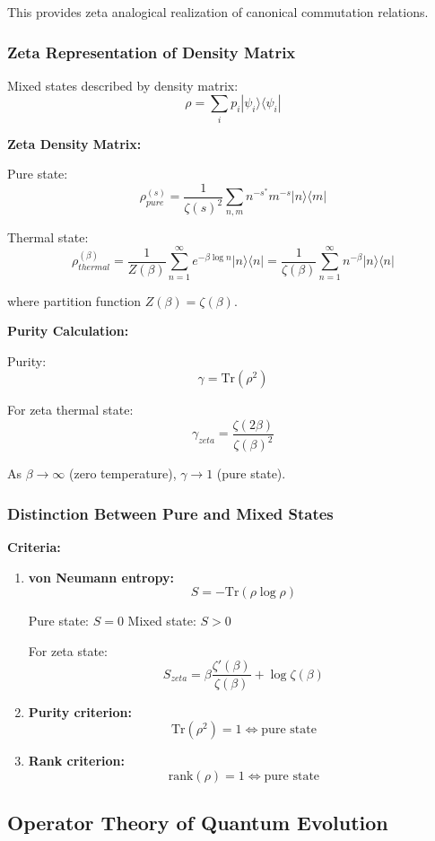 \documentclass[11pt]{article}
\theoremstyle{plain}
\theoremstyle{definition}
\theoremstyle{remark}
\begin{document}
This provides zeta analogical realization of canonical commutation relations.

\subsubsection{Zeta Representation of Density Matrix}

Mixed states described by density matrix:
$$\rho = \sum_i p_i |\psi_i\rangle\langle\psi_i|$$

\textbf{Zeta Density Matrix:}

Pure state:
$$\rho_{pure}^{(s)} = \frac{1}{\zeta(s)^2} \sum_{n,m} n^{-s^*} m^{-s} |n\rangle\langle m|$$

Thermal state:
$$\rho_{thermal}^{(\beta)} = \frac{1}{Z(\beta)} \sum_{n=1}^{\infty} e^{-\beta \log n} |n\rangle\langle n| = \frac{1}{\zeta(\beta)} \sum_{n=1}^{\infty} n^{-\beta} |n\rangle\langle n|$$

where partition function $Z(\beta) = \zeta(\beta)$.

\textbf{Purity Calculation:}

Purity:
$$\gamma = \text{Tr}(\rho^2)$$

For zeta thermal state:
$$\gamma_{zeta} = \frac{\zeta(2\beta)}{\zeta(\beta)^2}$$

As $\beta \to \infty$ (zero temperature), $\gamma \to 1$ (pure state).

\subsubsection{Distinction Between Pure and Mixed States}

\textbf{Criteria:}

\begin{enumerate}
\item \textbf{von Neumann entropy:}
$$S = -\text{Tr}(\rho \log \rho)$$

Pure state: $S = 0$
Mixed state: $S > 0$

For zeta state:
$$S_{zeta} = \beta \frac{\zeta'(\beta)}{\zeta(\beta)} + \log \zeta(\beta)$$

\item \textbf{Purity criterion:}
$$\text{Tr}(\rho^2) = 1 \Leftrightarrow \text{pure state}$$

\item \textbf{Rank criterion:}
$$\text{rank}(\rho) = 1 \Leftrightarrow \text{pure state}$$
\end{enumerate}

\subsection{Operator Theory of Quantum Evolution}
\end{document}
